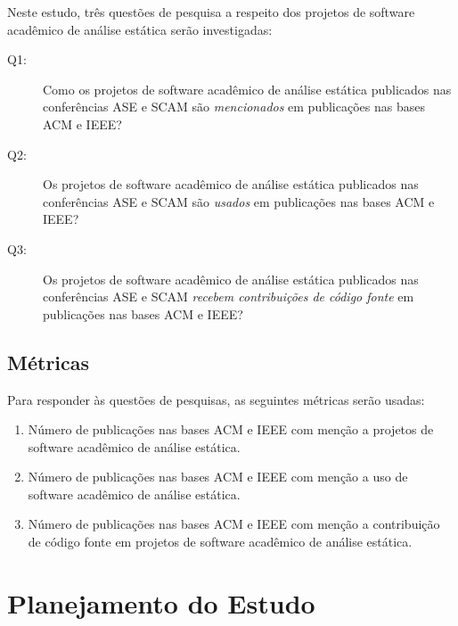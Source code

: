 
Neste estudo, três questões de pesquisa a respeito dos projetos de
software acadêmico de análise estática serão investigadas:

\newcommand{\EstudoDoisQuestaoUm}{
  Como os projetos de software acadêmico de análise estática publicados nas
  conferências ASE e SCAM são \textit{mencionados} em publicações nas bases ACM e IEEE?
}
\newcommand{\EstudoDoisQuestaoDois}{
  Os projetos de software acadêmico de análise estática publicados nas
  conferências ASE e SCAM são \textit{usados} em publicações nas bases ACM e IEEE?
}
\newcommand{\EstudoDoisQuestaoTres}{
  Os projetos de software acadêmico de análise estática publicados nas
  conferências ASE e SCAM \textit{recebem contribuições de código fonte} em publicações
  nas bases ACM e IEEE?
}

\begin{description}
  \item [Q1:] \EstudoDoisQuestaoUm
  \item [Q2:] \EstudoDoisQuestaoDois
  \item [Q3:] \EstudoDoisQuestaoTres
\end{description}

\subsection{Métricas}

Para responder às questões de pesquisas, as seguintes métricas serão usadas:

\begin{enumerate}
  \item Número de publicações nas bases ACM e IEEE com menção a projetos de
    software acadêmico de análise estática.
  \item Número de publicações nas bases ACM e IEEE com menção a uso de
    software acadêmico de análise estática.
  \item Número de publicações nas bases ACM e IEEE com menção a contribuição de
    código fonte em projetos de software acadêmico de análise estática.
\end{enumerate}


\section{Planejamento do Estudo} \label{estudo2:planejamento} %

